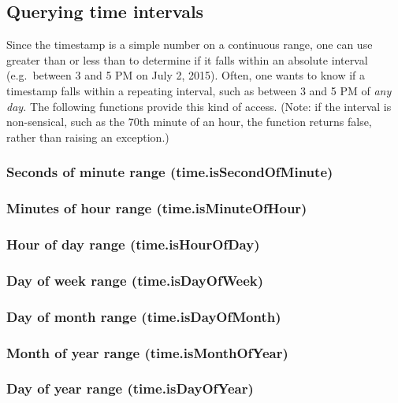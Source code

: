 \documentclass{article}
\theoremstyle{definition}
\begin{document}
\subsection{Querying time intervals}

Since the timestamp is a simple number on a continuous range, one can use greater than or less than to determine if it falls within an absolute interval (e.g.\ between 3 and 5 PM on July 2, 2015).  Often, one wants to know if a timestamp falls within a repeating interval, such as between 3 and 5 PM of {\it any day.}  The following functions provide this kind of access.  (Note: if the interval is non-sensical, such as the 70th minute of an hour, the function returns false, rather than raising an exception.)

\subsubsection{Seconds of minute range (time.isSecondOfMinute)}

\subsubsection{Minutes of hour range (time.isMinuteOfHour)}

\subsubsection{Hour of day range (time.isHourOfDay)}

\subsubsection{Day of week range (time.isDayOfWeek)}

\subsubsection{Day of month range (time.isDayOfMonth)}

\subsubsection{Month of year range (time.isMonthOfYear)}

\subsubsection{Day of year range (time.isDayOfYear)}
\end{document}
